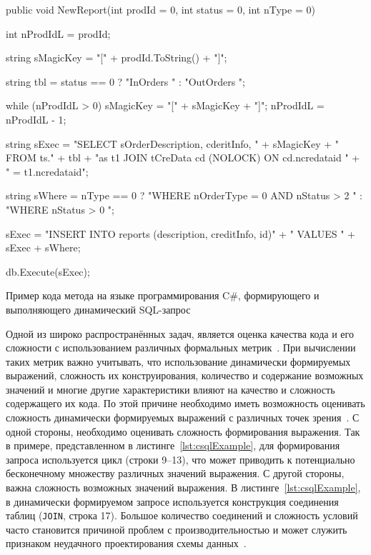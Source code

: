 \begin{listing}
    \begin{pyglist}[language=csharp,numbers=left,numbersep=5pt]

public void NewReport(int prodId = 0, int status = 0, int nType = 0)
{
    int nProdIdL = prodId;

    string sMagicKey = "[" + prodId.ToString() + "]";

    string tbl = status == 0 ? "InOrders " : "OutOrders ";

    while (nProdIdL > 0)
    {
        sMagicKey = "[" + sMagicKey + "]";
        nProdIdL = nProdIdL - 1;
    }

    string sExec =
        "SELECT sOrderDescription, cderitInfo, " + sMagicKey
        + " FROM ts." + tbl +
        "as t1 JOIN tCreData cd (NOLOCK) ON cd.ncredataid "
        + " = t1.ncredataid";

    string sWhere = nType == 0
        ? "WHERE nOrderType = 0 AND nStatus > 2 "
        : "WHERE nStatus > 0 ";

    sExec = "INSERT INTO reports (description, creditInfo, id)"
            + " VALUES " + sExec + sWhere;

    db.Execute(sExec);
}
\end{pyglist}
\caption{Пример кода метода на языке программирования C\#, формирующего и выполняющего динамический SQL-запрос}
\label{lst:csqlExample}
\end{listing}

Одной из широко распространённых задач, является оценка качества кода и его сложности с использованием различных формальных метрик~\cite{SoftwareMetrics}. При вычислении таких метрик важно учитывать, что использование динамически формируемых выражений, сложность их конструирования, количество и содержание возможных значений и многие другие характеристики влияют на качество и сложность содержащего их кода. По этой причине необходимо иметь возможность оценивать сложность динамически формируемых выражений с различных точек зрения~\cite{DSQLQualityMesure,DSQLQualityMesureBIG}. С одной стороны, необходимо оценивать сложность формирования выражения. Так в примере, представленном в листинге~\ref{lst:csqlExample}, для формирования запроса используется цикл (строки 9--13), что может приводить к потенциально бесконечному множеству различных значений выражения. С другой стороны, важна сложность возможных значений выражения. В листинге~\ref{lst:csqlExample}, в динамически формируемом запросе используется конструкция соединения таблиц (\verb|JOIN|, строка 17). Большое количество соединений и сложность условий часто становится причиной проблем с производительностью и может служить признаком неудачного проектирования схемы данных~\cite{DSQLQualityMesureBIG}.

